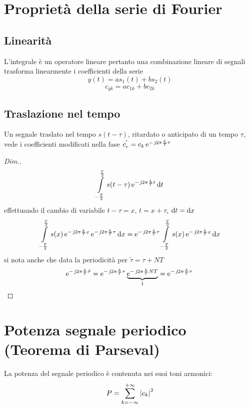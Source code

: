 \section{Proprietà della serie di Fourier}
\subsection{Linearità}
L'integrale è un operatore lineare pertanto una combinazione lineare di segnali trasforma linearmente i coefficienti della serie
\[
	 y(t)=a s_1(t)+ b s_2(t)
\]
\[
	 c_{y k}= a c_{1 k} + b c_{2 k}
\]

\subsection{Traslazione nel tempo}
Un segnale traslato nel tempo $s(t-\tau)$, ritardato o anticipato di un tempo $\tau$, vede i coefficienti modificati nella fase $c_r^{'}=c_k \operatorname{e}^{-\operatorname{\mathit{j}\!} 2\pi\frac{k}{T}\tau}$

\begin{proof}[Dim.]
\[
	 \int\limits_{-\frac{T}{2}}^{\frac{T}{2}}{s(t-\tau)\operatorname{e}^{-\operatorname{\mathit{j}\!} 2\pi\frac{k}{T}t}}{\,\mathop{}\!\mathrm{d}{t}}
\]
effettuando il cambio di variabile $t-\tau=x$, $t=x+\tau$, $\mathop{}\!\mathrm{d} t=\mathop{}\!\mathrm{d} x$
\[
	\int\limits_{-\frac{T}{2}}^{\frac{T}{2}}{s(x)\operatorname{e}^{-\operatorname{\mathit{j}\!} 2\pi\frac{k}{T}x}\operatorname{e}^{-\operatorname{\mathit{j}\!} 2\pi\frac{k}{T}\tau}}{\,\mathop{}\!\mathrm{d}{x}} =
	\operatorname{e}^{-\operatorname{\mathit{j}\!} 2\pi\frac{k}{T}\tau} \int\limits_{-\frac{T}{2}}^{\frac{T}{2}}{s(x)\operatorname{e}^{-\operatorname{\mathit{j}\!} 2\pi\frac{k}{T}x}}{\,\mathop{}\!\mathrm{d}{x}}
\]
si nota anche che data la periodicità per $\tilde{\tau}=\tau+N T$
\[
	\operatorname{e}^{-\operatorname{\mathit{j}\!} 2\pi\frac{k}{T}\tilde{\tau}}=
	\operatorname{e}^{-\operatorname{\mathit{j}\!} 2\pi\frac{k}{T}\tau} \underbrace{\operatorname{e}^{-\operatorname{\mathit{j}\!} 2\pi\frac{k}{T}N T}}_{1}=\operatorname{e}^{-\operatorname{\mathit{j}\!} 2\pi\frac{k}{T}\tau}
\qedhere
\]
\end{proof}

\section{Potenza segnale periodico (Teorema di Parseval)}
La potenza del segnale periodico è contenuta nei suoi toni armonici:
\begin{equation}
\label{eq:teo_Parseval}
	P=\sum_{k=-\infty}^{+\infty}{\left|{c_k}\right|^2}
\end{equation}

